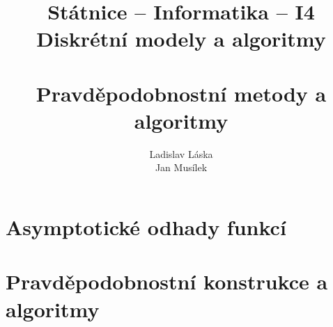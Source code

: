 \documentclass[a4paper,12pt,titlepage]{article}
\title{Státnice -- Informatika -- I4\\ Diskrétní modely a algoritmy\\ ~\\ 
Pravděpodobnostní metody a algoritmy}
\author{Ladislav Láska\\ Jan Musílek}
\begin{document}
\maketitle
\newpage
\tableofcontents
\newpage





\section{Asymptotické odhady funkcí}
\section{Pravděpodobnostní konstrukce a algoritmy}

\end{document}
